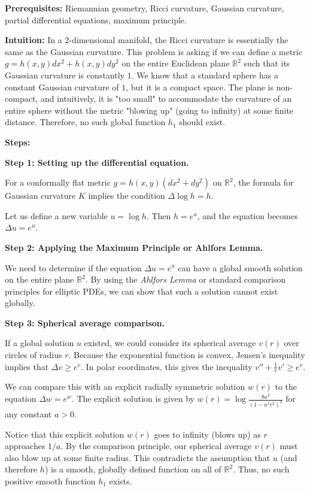 \begin{solution}
\textbf{Prerequisites:} Riemannian geometry, Ricci curvature, Gaussian curvature, partial differential equations, maximum principle.

\textbf{Intuition:} In a 2-dimensional manifold, the Ricci curvature is essentially the same as the Gaussian curvature. This problem is asking if we can define a metric $g = h(x,y) dx^2 + h(x,y) dy^2$ on the entire Euclidean plane $\mathbb{R}^2$ such that its Gaussian curvature is constantly $1$. We know that a standard sphere has a constant Gaussian curvature of $1$, but it is a compact space. The plane is non-compact, and intuitively, it is "too small" to accommodate the curvature of an entire sphere without the metric "blowing up" (going to infinity) at some finite distance. Therefore, no such global function $h_1$ should exist.

\textbf{Steps:}

\textbf{Step 1: Setting up the differential equation.}

For a conformally flat metric $g = h(x,y) (dx^2 + dy^2)$ on $\mathbb{R}^2$, the formula for Gaussian curvature $K$ implies the condition $\Delta \log h = h$.

Let us define a new variable $u = \log h$. Then $h = e^u$, and the equation becomes $\Delta u = e^u$.

\textbf{Step 2: Applying the Maximum Principle or Ahlfors Lemma.}

We need to determine if the equation $\Delta u = e^u$ can have a global smooth solution on the entire plane $\mathbb{R}^2$. By using the \textit{Ahlfors Lemma} or standard comparison principles for elliptic PDEs, we can show that such a solution cannot exist globally.

\textbf{Step 3: Spherical average comparison.}

If a global solution $u$ existed, we could consider its spherical average $v(r)$ over circles of radius $r$. Because the exponential function is convex, Jensen's inequality implies that $\Delta v \geq e^v$. In polar coordinates, this gives the inequality $v'' + \frac{1}{r} v' \geq e^v$.

We can compare this with an explicit radially symmetric solution $w(r)$ to the equation $\Delta w = e^w$. The explicit solution is given by $w(r) = \log \frac{8a^2}{(1-a^2 r^2)^2}$ for any constant $a > 0$.

Notice that this explicit solution $w(r)$ goes to infinity (blows up) as $r$ approaches $1/a$. By the comparison principle, our spherical average $v(r)$ must also blow up at some finite radius. This contradicts the assumption that $u$ (and therefore $h$) is a smooth, globally defined function on all of $\mathbb{R}^2$. Thus, no such positive smooth function $h_1$ exists.
\end{solution}

